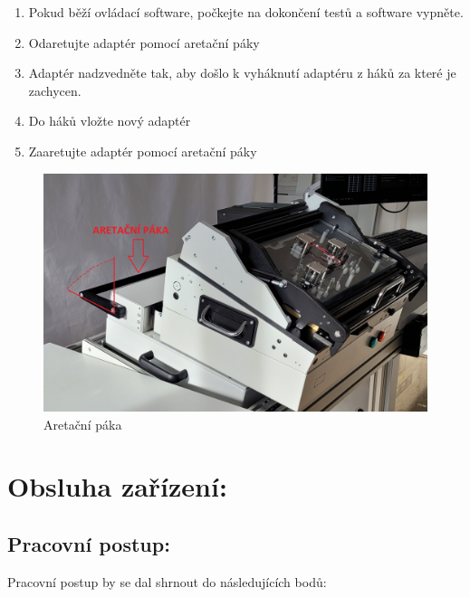 	\begin{minipage}{0.5\textwidth}
		\begin{enumerate}
			\item Pokud běží ovládací software, počkejte na dokončení testů a software vypněte.
			\item Odaretujte adaptér pomocí aretační páky
			\item Adaptér nadzvedněte tak, aby došlo k vyháknutí adaptéru z háků za které je zachycen.
			\item Do háků vložte nový adaptér
			\item Zaaretujte adaptér pomocí aretační páky
		\end{enumerate}
	\end{minipage}
	\hfill
	\begin{minipage}{0.4\textwidth}
		\begin{figure}[H]
			\includegraphics[width = \textwidth]{obrazky/aretacni_paka.png}
            \caption{Aretační páka}
		\end{figure}
	\end{minipage}

% 
\chapter{Obsluha zařízení:}
\section{Pracovní postup:}
	Pracovní postup by se dal shrnout do následujících bodů:

